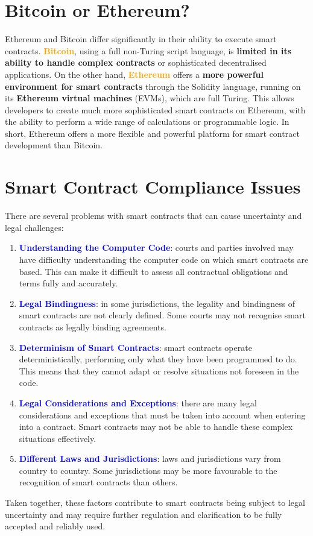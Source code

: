 \section{Bitcoin or Ethereum? \texorpdfstring{\faBitcoin}{} \ \texorpdfstring{\faEthereum}{}}

Ethereum and Bitcoin differ significantly in their ability to execute smart contracts. \textbf{\textcolor{Orange}{Bitcoin}}, using a full non-Turing script language, is \textbf{limited in its ability to handle complex contracts} or sophisticated decentralised applications. On the other hand, \textbf{\textcolor{Orange}{Ethereum}} offers a \textbf{more powerful environment for smart contracts} through the Solidity language, running on its \textbf{Ethereum virtual machines} (EVMs), which are full Turing. This allows developers to create much more sophisticated smart contracts on Ethereum, with the ability to perform a wide range of calculations or programmable logic. In short, Ethereum offers a more flexible and powerful platform for smart contract development than Bitcoin.

\section{Smart Contract Compliance Issues}
There are several problems with smart contracts that can cause uncertainty and legal challenges:
\begin{enumerate}
    \item \textbf{\textcolor{Blue}{Understanding the Computer Code}}: courts and parties involved may have difficulty understanding the computer code on which smart contracts are based. This can make it difficult to assess all contractual obligations and terms fully and accurately.
    \item \textbf{\textcolor{Blue}{Legal Bindingness}}: in some jurisdictions, the legality and bindingness of smart contracts are not clearly defined. Some courts may not recognise smart contracts as legally binding agreements.
    \item \textbf{\textcolor{Blue}{Determinism of Smart Contracts}}: smart contracts operate deterministically, performing only what they have been programmed to do. This means that they cannot adapt or resolve situations not foreseen in the code.
    \item \textbf{\textcolor{Blue}{Legal Considerations and Exceptions}}: there are many legal considerations and exceptions that must be taken into account when entering into a contract. Smart contracts may not be able to handle these complex situations effectively.
    \item \textbf{\textcolor{Blue}{Different Laws and Jurisdictions}}: laws and jurisdictions vary from country to country. Some jurisdictions may be more favourable to the recognition of smart contracts than others.
\end{enumerate}
Taken together, these factors contribute to smart contracts being subject to legal uncertainty and may require further regulation and clarification to be fully accepted and reliably used.

